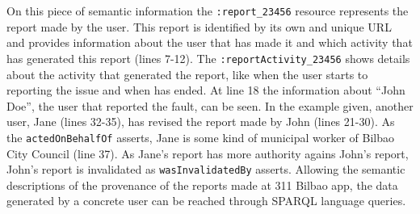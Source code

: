 On this piece of semantic information the \texttt{:report\_23456} resource represents the report made by the user. This report is identified by its own and unique URL and provides information about the user that has made it and which activity that has generated this report (lines 7-12). The \texttt{:reportActivity\_23456} shows details about the activity that generated the report, like when the user starts to reporting the issue and when has ended. At line 18 the information about ``John Doe'', the user that reported the fault, can be seen. In the example given, another user, Jane (lines 32-35), has revised the report made by John (lines 21-30). As the \texttt{actedOnBehalfOf} asserts, Jane is some kind of municipal worker of Bilbao City Council (line 37). As Jane's report has more authority agains John's report, John's report is invalidated as \texttt{wasInvalidatedBy} asserts. Allowing the semantic descriptions of the provenance of the reports made at 311 Bilbao app, the data generated by a concrete user can be reached through SPARQL \cite{prudhommeaux_sparql_2008} language queries.

